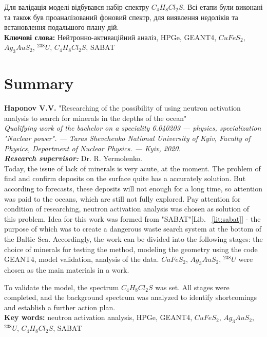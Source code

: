 \documentclass[a4paper, 14pt]{article}
\numberwithin{equation}{section}
\numberwithin{table}{section}
\begin{document}
	Для валідація моделі відбувався набір спектру $C_4H_8Cl_2S$.
	Всі етапи були виконані та також був проаналізований фоновий спектр, для виявлення недоліків та встановлення подальшого плану дій. \\
	{\bf Ключові слова:} Нейтронно-активаційний аналіз, HPGe, GEANT4, $CuFeS_2$, $Ag_3AuS_2$, $^{238}U$, $C_4H_8Cl_2S$, SABAT
	
	\newpage
	\thispagestyle{empty}
	\section*{Summary}
	
	{\bf Haponov V.V.} "Researching of the possibility of using neutron activation analysis to search for minerals in the depths of the ocean"\\
	{\itshape Qualifying work of the bachelor on a speciality 6.040203 --- physics, specialization "Nuclear power". --- Taras Shevchenko National University of Kyiv, Faculty of Physics, Department of Nuclear Physics. --- Kyiv, 2020.\\}
	{\itshape \bfseries Research supervisor:} Dr. R. Yermolenko.
	\\[0.5cm]
	Today, the issue of lack of minerals is very acute, at the moment. The problem of find and confirm deposits on the surface quite has a accurately solution. But according to forecasts, these deposits will not enough for a long time, so attention was paid to the oceans, which are still not fully explored.
	Pay attention for condition of researching, neutron activation analysis was chosen as solution of this problem. Idea for this work was formed from "SABAT"[Lib. ~\ref{lit:sabat}] - the purpose of which was to create a dangerous waste search system at the bottom of the Baltic Sea. Accordingly, the work can be divided into the following stages: the choice of minerals for testing the method, modeling the geometry using the code GEANT4, model validation, analysis of the data. $ CuFeS_2 $, $ Ag_3AuS_2 $, $ ^ {238} U $ were chosen as the main materials in a work.
	
	To validate the model, the spectrum $ C_4H_8Cl_2S $ was set.
	All stages were completed, and the background spectrum was analyzed to identify shortcomings and establish a further action plan. \\
	
	{\bf Key words:} neutron activation analysis, HPGe, GEANT4, $CuFeS_2$, $Ag_3AuS_2$, $^{238}U$, $C_4H_8Cl_2S$, SABAT
	
	\newpage
	\tableofcontents
	\newpage
	\pagestyle{plain}
	\setcounter{page}{2}
	
\end{document}
